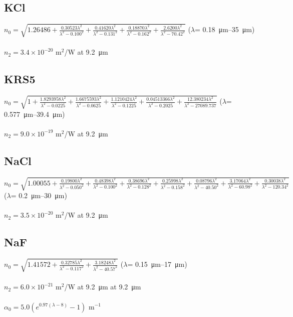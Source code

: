 \documentclass{report}
\begin{document}
\begin{appendices}
\subsection*{KCl}
$n_0=\sqrt{1.26486+\frac{0.30523\lambda^2}{\lambda^2-0.100^2}+\frac{0.41620\lambda^2}{\lambda^2-0.131^2}+\frac{0.18870\lambda^2}{\lambda^2-0.162^2}+\frac{2.6200\lambda^2}{\lambda^2-70.42^2}}$ (\(\lambda\)= \SIrange{0.18}{35}{\micro\meter}) \cite{Li-1976}\\
\\
$n_2 = 3.4 \times 10^{-20}$ m$^2$/W at \SI{9.2}{\micro\meter} \cite{Polyanskiy-2021b}

\subsection*{KRS5}
$n_0=\sqrt{1+\frac{1.8293958\lambda^2}{\lambda^2-0.0225}+\frac{1.6675593\lambda^2}{\lambda^2-0.0625}+\frac{1.1210424\lambda^2}{\lambda^2-0.1225}+\frac{0.04513366\lambda^2}{\lambda^2-0.2025}+\frac{12.380234\lambda^2}{\lambda^2-27089.737}}$ (\(\lambda\)= \SIrange{0.577}{39.4}{\micro\meter}) \cite{Rodney-1956}\\
\\
$n_2 = 9.0 \times 10^{-19}$ m$^2$/W at \SI{9.2}{\micro\meter} \cite{Polyanskiy-2023}

\subsection*{NaCl}
$n_0=\sqrt{1.00055+\frac{0.19800\lambda^2}{\lambda^2-0.050^2}+\frac{0.48398\lambda^2}{\lambda^2-0.100^2}+\frac{0.38696\lambda^2}{\lambda^2-0.128^2}+\frac{0.25998\lambda^2}{\lambda^2-0.158^2}+\frac{0.08796\lambda^2}{\lambda^2-40.50^2}+\frac{3.17064\lambda^2}{\lambda^2-60.98^2}+\frac{0.30038\lambda^2}{\lambda^2-120.34^2}}$ (\(\lambda\)= \SIrange{0.2}{30}{\micro\meter}) \cite{Li-1976}\\
\\
$n_2 = 3.5 \times 10^{-20}$ m$^2$/W at \SI{9.2}{\micro\meter} \cite{Polyanskiy-2021b}

\subsection*{NaF}
$n_0=\sqrt{1.41572+\frac{0.32785\lambda^2}{\lambda^2-0.117^2}+\frac{3.18248\lambda^2}{\lambda^2-40.57^2}}$ (\(\lambda\)= \SIrange{0.15}{17}{\micro\meter}) \cite{Li-1976}\\
\\
$n_2 = 6.0 \times 10^{-21}$ m$^2$/W at \SI{9.2}{\micro\meter} at \SI{9.2}{\micro\meter} \cite{Polyanskiy-2023}\\
\\
$\alpha_0 = 5.0 (e^{0.97(\lambda-8)}-1)$ m$^{-1}$ \cite{Polyanskiy-2023}


\end{appendices}
\end{document}
